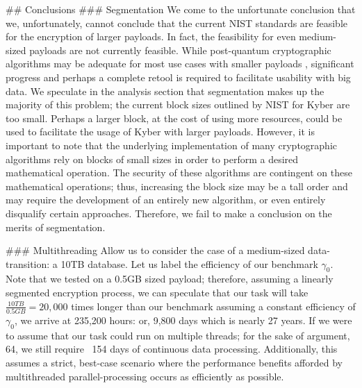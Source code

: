 \documentclass[12pt]{article}
\begin{document}
## Conclusions
### Segmentation
We come to the unfortunate conclusion that we, unfortunately, cannot conclude that the current NIST standards are feasible for the encryption of larger payloads. In fact, the feasibility for even medium-sized payloads are not currently feasible. While post-quantum cryptographic algorithms may be adequate for most use cases with smaller payloads , significant progress and perhaps a complete retool is required to facilitate usability with big data. We speculate in the analysis section that segmentation makes up the majority of this problem; the current block sizes outlined by NIST for Kyber are too small. Perhaps a larger block, at the cost of using more resources, could be used to facilitate the usage of Kyber with larger payloads. However, it is important to note that the underlying implementation of many cryptographic algorithms rely on blocks of small sizes in order to perform a desired mathematical operation. The security of these algorithms are contingent on these mathematical operations; thus, increasing the block size may be a tall order and may require the development of an entirely new algorithm, or even entirely disqualify certain approaches. Therefore, we fail to make a conclusion on the merits of segmentation. 

### Multithreading
Allow us to consider the case of a medium-sized data-transition: a 10TB database. Let us label the efficiency of our benchmark $\gamma_0$. Note that we tested on a 0.5GB sized payload; therefore, assuming a linearly segmented encryption process, we can speculate that our task will take $\frac{10TB}{0.5GB} = 20,000$ times longer than our benchmark assuming a constant efficiency of $\gamma_0$, we arrive at 235,200 hours: or, 9,800 days which is nearly 27 years. If we were to assume that our task could run on multiple threads; for the sake of argument, 64, we still require ~154 days of continuous data processing. Additionally, this assumes a strict, best-case scenario where the performance benefits afforded by multithreaded parallel-processing occurs as efficiently as possible.
\end{document}
